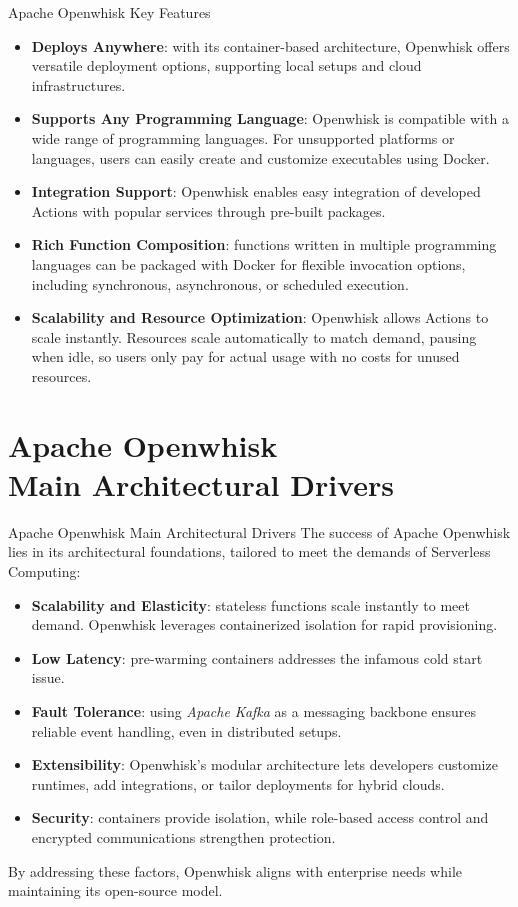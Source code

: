 \documentclass[aspectratio=169]{beamer}
\begin{document}
\begin{frame}{Apache Openwhisk Key Features}
\begin{itemize}
    \item \textbf{Deploys Anywhere}: with its container-based architecture, Openwhisk offers versatile deployment options, supporting local setups and cloud infrastructures.
    \item \textbf{Supports Any Programming Language}: Openwhisk is compatible with a wide range of programming languages. For unsupported platforms or languages, users can easily create and customize executables using Docker.
    \item \textbf{Integration Support}: Openwhisk enables easy integration of developed Actions with popular services through pre-built packages.
    \item \textbf{Rich Function Composition}: functions written in multiple programming languages can be packaged with Docker for flexible invocation options, including synchronous, asynchronous, or scheduled execution.
    \item \textbf{Scalability and Resource Optimization}: Openwhisk allows Actions to scale instantly. Resources scale automatically to match demand, pausing when idle, so users only pay for actual usage with no costs for unused resources.
\end{itemize}
\end{frame}

\section{Apache Openwhisk \\Main Architectural Drivers}
\begin{frame}{Apache Openwhisk Main Architectural Drivers}
The success of Apache Openwhisk lies in its architectural foundations, tailored to meet the demands of Serverless Computing:
\begin{itemize}
    \item \textbf{Scalability and Elasticity}: stateless functions scale instantly to meet demand. Openwhisk leverages containerized isolation for rapid provisioning.
    \item \textbf{Low Latency}: pre-warming containers addresses the infamous cold start issue.
    \item \textbf{Fault Tolerance}: using \textit{Apache Kafka} as a messaging backbone ensures reliable event handling, even in distributed setups.
    \item \textbf{Extensibility}: Openwhisk’s modular architecture lets developers customize runtimes, add integrations, or tailor deployments for hybrid clouds.
    \item \textbf{Security}: containers provide isolation, while role-based access control and encrypted communications strengthen protection.
\end{itemize}
By addressing these factors, Openwhisk aligns with enterprise needs while maintaining its open-source model.
\end{frame}
\end{document}
